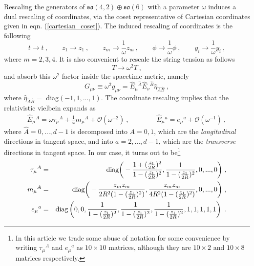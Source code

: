 \documentclass[12pt]{article}
\numberwithin{equation}{section}
\begin{document}
Rescaling the generators of $\mathfrak{so}(4,2) \oplus \mathfrak{so}(6)$ with a parameter $\omega$ induces a dual rescaling of coordinates,  via the coset representative of Cartesian coordinates given in eqn. (\ref{cartesian_coset}).  The induced rescaling of coordinates is the following
\begin{equation}
t \rightarrow t \ ,  \qquad 
z_1 \rightarrow z_1 \ ,  \qquad
 z_m \rightarrow \frac{1}{\omega} z_m \ , \qquad
 \phi \rightarrow \frac{1}{\omega} \phi \ ,  \qquad
 y_i \rightarrow \frac{1}{\omega} y_i \ , 
\end{equation}
where $m = 2, 3,4$. It is also convenient to rescale the string tension as follows
\begin{equation}
T \rightarrow \omega^2 T \ , 
\end{equation}
and absorb this $\omega^2$ factor inside the spacetime metric, namely
\begin{equation}
G_{\mu\nu} \equiv \omega^2 g_{\mu\nu} = \hat{E}_{\mu}{}^{\hat{A}} \hat{E}_{\nu}{}^{\hat{B}} \hat{\eta}_{\hat{A}\hat{B}} \ , 
\end{equation} 
where $\hat{\eta}_{\hat{A}\hat{B}} =$ diag$(-1, 1, ..., 1)$. The coordinate rescaling implies that the relativistic vielbein expands as
\begin{eqnarray}
\label{vielbeine_exp}
\hat{E}_{\mu}{}^A = \omega \tau_{\mu}{}^A + \frac{1}{\omega} m_{\mu}{}^A + \mathcal{O}(\omega^{-2})\ , \qquad\qquad
\hat{E}_{\mu}{}^a = e_{\mu}{}^a + \mathcal{O}(\omega^{-1}) \ , 
\end{eqnarray}
where $\hat{A} = 0, ... , d-1$ is decomposed into $A= 0, 1$, which are the \emph{longitudinal} directions in tangent space, and into $a = 2, ..., d-1$, which are the \emph{transverse} directions in tangent space. 
In our case, it turns out to be\footnote{In this article we trade some abuse of notation for some convenience by writing $\tau_\mu{}^A$ and $e_\mu{}^a$ as $10\times 10$ matrices, although they are $10\times 2$ and $10 \times 8$ matrices respectively.}
\begin{eqnarray}
\label{NR_vielbeine}
\notag
\tau_{\mu}{}^A &=& \text{diag}\bigg(-\frac{1+ (\frac{z_1}{2R})^2}{1- (\frac{z_1}{2R})^2},   \frac{1}{1 - (\frac{z_1}{2R})^2}, 0, ... , 0 \bigg) \ , \\
m_{\mu}{}^A &=& \text{diag}\bigg(-\frac{z_m z_m}{2R^2(1-(\frac{z_1}{2R})^2)},  \frac{z_m z_m}{4R^2(1-(\frac{z_1}{2R})^2)}, 0, ... , 0 \bigg) \ , \\
\notag
e_{\mu}{}^a &=&\text{diag} \left(0, 0, \frac{1}{1 - (\frac{z_1}{2R})^2}, \frac{1}{1 - (\frac{z_1}{2R})^2}, \frac{1}{1 - (\frac{z_1}{2R})^2}, 1,1,1,1,1 \right) \ .
\end{eqnarray}
\end{document}
